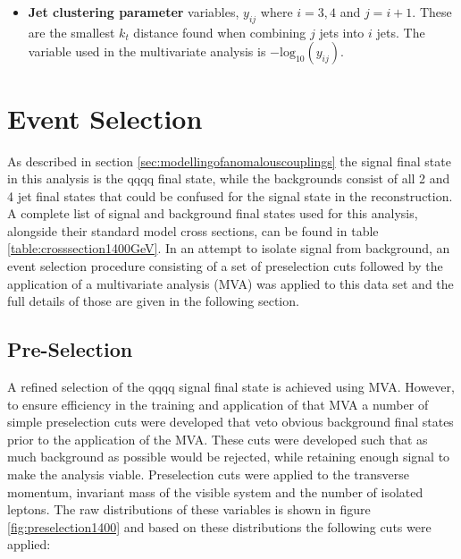 \begin{itemize}
\item \textbf{Jet clustering parameter} variables, $y_{ij}$ where $i = 3,4$ and $j=i+1$.  These are the smallest $k_{t}$ distance found when combining $j$ jets into $i$ jets.  The variable used in the multivariate analysis is $-\text{log}_{10}(y_{ij})$.
\end{itemize}


\section{Event Selection}
\label{sec:eventselection}
As described in section \ref{sec:modellingofanomalouscouplings} the signal final state in this analysis is the \nu{\nu}qqqq final state, while the backgrounds consist of all 2 and 4 jet final states that could be confused for the signal state in the reconstruction.  A complete list of signal and background final states used for this analysis, alongside their standard model cross sections, can be found in table \ref{table:crosssection1400GeV}.  In an attempt to isolate signal from background, an event selection procedure consisting of a set of preselection cuts followed by the application of a multivariate analysis (MVA) was applied to this data set and the full details of those are given in the following section.


\subsection{Pre-Selection}
\label{sec:preselection1400GeV}
A refined selection of the \nu{\nu}qqqq signal final state is achieved using MVA.  However, to ensure efficiency in the training and application of that MVA a number of simple preselection cuts were developed that veto obvious background final states prior to the application of the MVA.  These cuts were developed such that as much background as possible would be rejected, while retaining enough signal to make the analysis viable.  Preselection cuts were applied to the transverse momentum, invariant mass of the visible system and the number of isolated leptons. The raw distributions of these variables is shown in figure \ref{fig:preselection1400} and based on these distributions the following cuts were applied:

